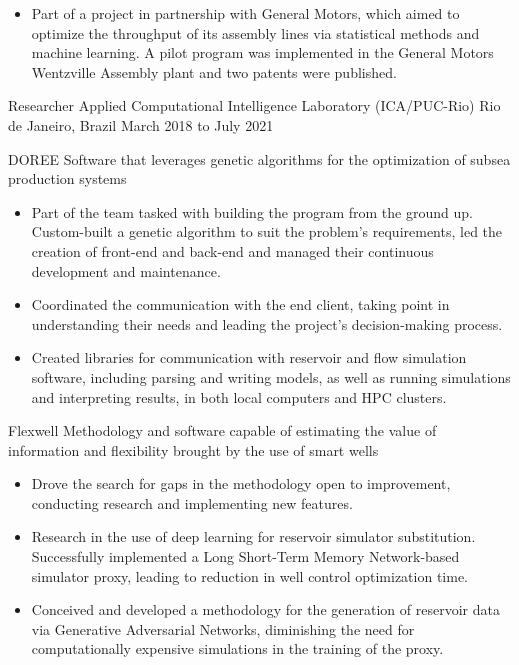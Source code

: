 \begin{itemize}
    \item Part of a project in partnership with General Motors, which aimed to optimize the throughput of its assembly
    lines via statistical methods and machine learning.
    A pilot program was implemented in the General Motors Wentzville Assembly plant and two patents were published.
\end{itemize}

\cvjob
    {Researcher}
    {Applied Computational Intelligence Laboratory (ICA/PUC-Rio)}
    {Rio de Janeiro, Brazil}
    {March 2018 to July 2021}

\cvsubjob
    {DOREE}
    {Software that leverages genetic algorithms for the optimization of subsea production systems}

\begin{itemize}
    \item Part of the team tasked with building the program from the ground up.
    Custom-built a genetic algorithm to suit the problem's requirements, led the creation of front-end and back-end and
    managed their continuous development and maintenance.
    \item Coordinated the communication with the end client, taking point in understanding their needs and leading the
    project's decision-making process.
    \item Created libraries for communication with reservoir and flow simulation software, including parsing and writing
    models, as well as running simulations and interpreting results, in both local computers and HPC clusters.
\end{itemize}

\cvsubjob
    {Flexwell}
    {Methodology and software capable of estimating the value of information and flexibility brought by the use of smart
    wells}

\begin{itemize}
    \item Drove the search for gaps in the methodology open to improvement, conducting research and implementing new
    features.
    \item Research in the use of deep learning for reservoir simulator substitution.
    Successfully implemented a Long Short-Term Memory Network-based simulator proxy, leading to reduction in well
    control optimization time.
    \item Conceived and developed a methodology for the generation of reservoir data via Generative Adversarial
    Networks, diminishing the need for computationally expensive simulations in the training of the proxy.
\end{itemize}

